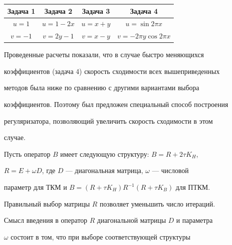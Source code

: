 \medskip 


 


\begin{center} 


\begin{tabular}{|c|c|c|c|} 


\hline 


Задача 1 & Задача 2 & Задача 3 & Задача 4 \\ 


\hline 


$u=1$ & $u=1-2x$ & $u=x+y$ & $u=\sin2\pi x$ \\ 


$v=-1$ & $v=2y-1$ & $v=x-y$ & $v=-2\pi y\cos2\pi x$\\ 


\hline 


\end{tabular}


\end{center} 


\medskip 


 


\noindent{}Проведенные расчеты показали, что в случае быстро меняющихся 


коэффициентов (задача 4) скорость сходимости всех вышеприведенных 


методов была ниже по сравнению с другими вариантами выбора 


коэффициентов. Поэтому был предложен специальный способ построения 


регуляризатора, позволяющий увеличить скорость сходимости в этом 


случае. 


 


Пусть оператор $B$ имеет следующую структуру: $B=R+2\tau K_H$, 


$R=E+\omega D$, где $D$ --- диагональная матрица, $\omega$ --- числовой 


параметр для ТКМ и $B=(R+\tau K_H)R^{-1}(R+\tau K_B)$ для ПТКМ. 


Правильный выбор матрицы $R$ позволяет уменьшить число итераций. 


 


Смысл введения в оператор $R$ диагональной матрицы $D$ и параметра 


$\omega$ состоит в том, что при выборе соответствующей структуры 


